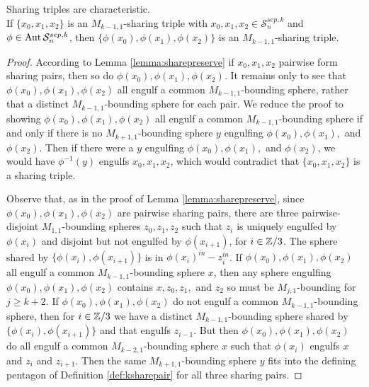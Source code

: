 \begin{lemma}
  Sharing triples are characteristic.\\
  If $\{x_0,x_1,x_2\}$ is an $M_{k-1,1}$-sharing triple with $x_0,x_1,x_2 \in \mathcal S^{sep,k}_n$
  and $\phi \in \operatorname{Aut} \mathcal S^{sep,k}_n$,
  then $\{\phi(x_0),\phi(x_1),\phi(x_2)\}$ is an $M_{k-1,1}$-sharing triple.
  \label{lemma:sharetrippreserve}
\end{lemma}

\begin{proof}
  According to Lemma \ref{lemma:sharepreserve}
  if $x_0,x_1,x_2$ pairwise form sharing pairs,
  then so do $\phi(x_0),\phi(x_1),\phi(x_2)$.
  It remains only to see that
  $\phi(x_0),\phi(x_1),\phi(x_2)$ all engulf a
  common $M_{k-1,1}$-bounding sphere, rather that a distinct
  $M_{k-1,1}$-bounding sphere for each pair.
  We reduce the proof to showing
  $\phi(x_0),\phi(x_1),\phi(x_2)$ all engulf a
  common $M_{k-1,1}$-bounding sphere if and only if there is
  no $M_{k+1,1}$-bounding sphere $y$ engulfing
  $\phi(x_0),\phi(x_1),$ and $\phi(x_2)$.
  Then if there were a $y$ engulfing $\phi(x_0),\phi(x_1),$ and $\phi(x_2)$, we would have
  $\phi^{-1}(y)$ engulfs $x_0,x_1,x_2$, which would contradict that
  $\{x_0,x_1,x_2\}$ is a sharing triple.

  Observe that, as in the proof of Lemma \ref{lemma:sharepreserve},
  since $\phi(x_0),\phi(x_1),\phi(x_2)$
  are pairwise sharing pairs,
  there are three pairwise-disjoint $M_{1,1}$-bounding spheres $z_0,z_1,z_2$
  such that $z_i$ is uniquely engulfed by $\phi(x_i)$ and disjoint
  but not engulfed by $\phi(x_{i+1})$, for $i \in \mathbb{Z}/3$.
  The sphere shared by $\{\phi(x_i),\phi(x_{i+1})\}$
  is in $\phi(x_i)^{in}-z_i^{in}$.
  If $\phi(x_0),\phi(x_1),\phi(x_2)$ all engulf a
  common $M_{k-1,1}$-bounding sphere $x$,
  then any sphere engulfing $\phi(x_0),\phi(x_1),\phi(x_2)$
  contains $x,z_0,z_1,$ and $z_2$ so must be $M_{j,1}$-bounding for $j\geq k+2$.
  If $\phi(x_0),\phi(x_1),\phi(x_2)$ do not engulf
  a common $M_{k-1,1}$-bounding sphere,
  then for $i \in \mathbb{Z}/3$
  we have a distinct $M_{k-1,1}$-bounding sphere
  shared by
  $\{\phi(x_i),\phi(x_{i+1})\}$ and that engulfs $z_{i-1}$.
  But then
  $\phi(x_0),\phi(x_1),\phi(x_2)$ do all engulf
  a common $M_{k-2,1}$-bounding sphere $x$
  such that $\phi(x_i)$ engulfs $x$ and $z_i$ and $z_{i+1}$.
  Then the same $M_{k+1,1}$-bounding sphere $y$ fits into the defining pentagon
  of Definition \ref{def:ksharepair}
  for all three sharing pairs.
\end{proof}

